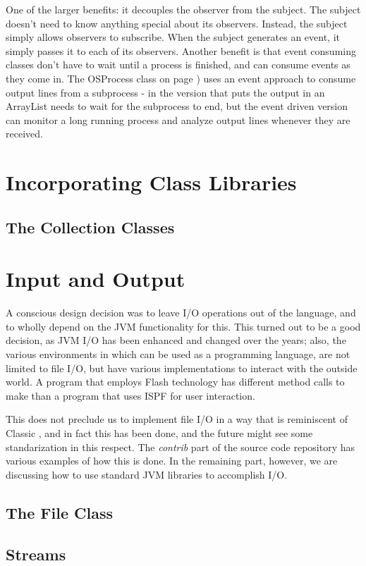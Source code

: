 One of the larger benefits: it decouples the observer from the
subject. The subject doesn't need to know anything special about its
observers. Instead, the subject simply allows observers to
subscribe. When the subject generates an event, it simply passes it to
each of its observers. Another benefit is that event consuming classes
don't have to wait until a process is finished, and can consume events
as they come in. The OSProcess class on page
\pageref{outputeventlistener}) uses an event approach to consume
output lines from a subprocess - in the version that puts the output
in an ArrayList needs to wait for the subprocess to end, but the event
driven version can monitor a long running process and analyze output
lines whenever they are received.

\chapter{Incorporating Class Libraries}
\section{The Collection Classes}

\chapter{Input and Output}
A conscious design decision was to leave I/O operations out of the
language, and to wholly depend on the JVM functionality for this. This
turned out to be a good decision, as JVM I/O has been enhanced and
changed over the years; also, the various environments in which \nr{}
can be used as a programming language, are not limited to file I/O,
but have various implementations to interact with the outside world. A
\nr{} program that employs Flash technology has different method calls
to make than a program that uses ISPF for user interaction.

This does not preclude us to implement file I/O in a way that is
reminiscent of Classic \Rexx{}, and in fact this has been done, and
the future might see some standarization in this respect. The
\emph{contrib} part of the \nr{} source code repository has various
  examples of how this is done. In the remaining part, however, we are
  discussing how to use standard JVM libraries to accomplish I/O.
\section{The File Class}
\section{Streams}

